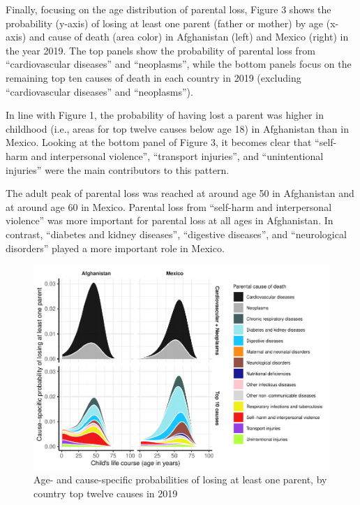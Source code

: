 \documentclass[
  11pt,
  letterpaper,
]{article}
\begin{document}
Finally, focusing on the age distribution of parental loss, Figure 3 shows the probability (y-axis) of losing at least one parent (father or mother) by age (x-axis) and cause of death (area color) in Afghanistan (left) and Mexico (right) in the year 2019. The top panels show the probability of parental loss from ``cardiovascular diseases'' and ``neoplasms'', while the bottom panels focus on the remaining top ten causes of death in each country in 2019 (excluding ``cardiovascular diseases'' and ``neoplasms'').

In line with Figure 1, the probability of having lost a parent was higher in childhood (i.e., areas for top twelve causes below age 18) in Afghanistan than in Mexico. Looking at the bottom panel of Figure 3, it becomes clear that ``self-harm and interpersonal violence'', ``transport injuries'', and ``unintentional injuries'' were the main contributors to this pattern.

The adult peak of parental loss was reached at around age 50 in Afghanistan and at around age 60 in Mexico. Parental loss from ``self-harm and interpersonal violence'' was more important for parental loss at all ages in Afghanistan. In contrast, ``diabetes and kidney diseases'', ``digestive diseases'', and ``neurological disorders'' played a more important role in Mexico.

\begin{figure}
\centering
\includegraphics{parental_loss_global_paa_ext_abstract_files/figure-latex/ber-prob-1.pdf}
\caption{\label{fig:ber-prob}Age- and cause-specific probabilities of losing at least one parent, by country top twelve causes in 2019}
\end{figure}
\end{document}
